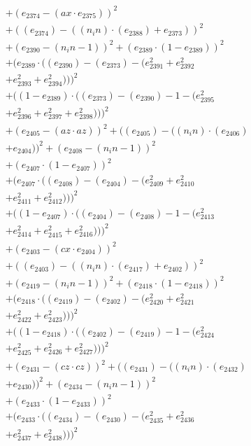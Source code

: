\documentclass[10pt, a4paper]{article}
\begin{document}
\begin{align*}
& + (e_{2374} - (ax  \cdot  e_{2375}))^{2} \\
& + ((e_{2374}) - ((n_in)  \cdot  (e_{2388}) + e_{2373}))^{2} \\
& + (e_{2390} - (n_in - 1))^{2} + (e_{2389}  \cdot  (1 - e_{2389}))^{2} \\
& + (e_{2389}  \cdot  ((e_{2390}) - (e_{2373}) - (e_{2391}^{2} + e_{2392}^{2} \\
& + e_{2393}^{2} + e_{2394}^{2})))^{2} \\
& + ((1 - e_{2389})  \cdot  ((e_{2373}) - (e_{2390}) - 1 - (e_{2395}^{2} \\
& + e_{2396}^{2} + e_{2397}^{2} + e_{2398}^{2})))^{2} \\
& + (e_{2405} - (az  \cdot  az))^{2} + ((e_{2405}) - ((n_in)  \cdot  (e_{2406}) \\
& + e_{2404}))^{2} + (e_{2408} - (n_in - 1))^{2} \\
& + (e_{2407}  \cdot  (1 - e_{2407}))^{2} \\
& + (e_{2407}  \cdot  ((e_{2408}) - (e_{2404}) - (e_{2409}^{2} + e_{2410}^{2} \\
& + e_{2411}^{2} + e_{2412}^{2})))^{2} \\
& + ((1 - e_{2407})  \cdot  ((e_{2404}) - (e_{2408}) - 1 - (e_{2413}^{2} \\
& + e_{2414}^{2} + e_{2415}^{2} + e_{2416}^{2})))^{2} \\
& + (e_{2403} - (cx  \cdot  e_{2404}))^{2} \\
& + ((e_{2403}) - ((n_in)  \cdot  (e_{2417}) + e_{2402}))^{2} \\
& + (e_{2419} - (n_in - 1))^{2} + (e_{2418}  \cdot  (1 - e_{2418}))^{2} \\
& + (e_{2418}  \cdot  ((e_{2419}) - (e_{2402}) - (e_{2420}^{2} + e_{2421}^{2} \\
& + e_{2422}^{2} + e_{2423}^{2})))^{2} \\
& + ((1 - e_{2418})  \cdot  ((e_{2402}) - (e_{2419}) - 1 - (e_{2424}^{2} \\
& + e_{2425}^{2} + e_{2426}^{2} + e_{2427}^{2})))^{2} \\
& + (e_{2431} - (cz  \cdot  cz))^{2} + ((e_{2431}) - ((n_in)  \cdot  (e_{2432}) \\
& + e_{2430}))^{2} + (e_{2434} - (n_in - 1))^{2} \\
& + (e_{2433}  \cdot  (1 - e_{2433}))^{2} \\
& + (e_{2433}  \cdot  ((e_{2434}) - (e_{2430}) - (e_{2435}^{2} + e_{2436}^{2} \\
& + e_{2437}^{2} + e_{2438}^{2})))^{2} \\

\end{align*}
\end{document}
